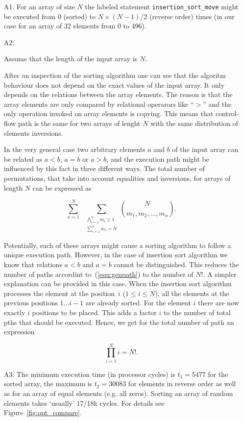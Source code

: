 \documentclass[12pt,a4paper,titlepage,oneside]{article}
\begin{document}
\begin{itemize}
\item[A1:]
For an array of size $N$ the labeled statement
\texttt{insertion\_sort\_move} might be executed from $0$ (sorted) to
$N\times(N-1)/2$ (reverse order) times (in our case for an array of 32 
elements from 0 to 496). 

\item[A2:] 

  Assume that the length of the input array is $N$.

  After an inspection of the sorting algorithm one can see that the
  algoritm behaviour does not depend on the exact values of the input
  array.
  It only depends on the relations between the array elements.
  The reason is that the array elements are only compared by
  relational operarors like ``$>$'' and the only operation invoked on
  array elements is copying.
  This means that control-flow path is the same for two arrays of
  lenght $N$ with the same distribution of elements inversions.

  In the very general case two arbitrary elements $a$ and $b$ of the
  input array can be related as $a<b$, $a=b$ or $a>b$, and the
  execution path might be influenced by this fact in three different
  ways.
  The total number of permutations, that take into account equalities
  and inversions, for arrays of length $N$ can be expressed as

  \begin{equation}
	\sum_{n=1}^N \ \ \sum_{\substack{
	  \bigwedge_{i=1}^n m_i \geq 1 
	  \\ \sum_{i=1}^n m_i = N}} \binom N {m_1, m_2, \ldots, m_n}.
	  \label{equ:genpath}
	\end{equation}

	Potentially, each of these arrays might cause a sorting algorithm
	to follow a unique execution path.
	However, in the case of insertion sort algorithm we know that
	relations $a<b$ and $a=b$ cannot be distinguished.
	This reduces the number of paths accordint to~(\ref{equ:genpath})
	to the number of $N!$.
	A simpler explanation can be provided in this case.
	When the insertion sort algorithm processes the element at the
	position~$i$ ($1 \leq i \leq N$), all the elements at the previous
	positions $1\ldots i-1$ are already sorted.
	For the element $i$ there are now exactly $i$ positions to be
	placed.
	This adds a factor $i$ to the number of total pths that should be
	executed.
	Hence, we get for the total number of path an expression

	$$
	  \prod_{i=1}^N i = N!.
	$$

           
\item[A3:] 
The minimum execution time (in processor cycles) is $t_1 = 5477$
for the sorted array, the maximum is $t_2 = 30083$ for elements in
reverse order as well as for an array of equal elements (e.g. all
zeros). Sorting an array of random elements takes `usually' 17/18k cycles.
For details see Figure~\ref{fig:opt_compare}.

\end{itemize}
\end{document}
